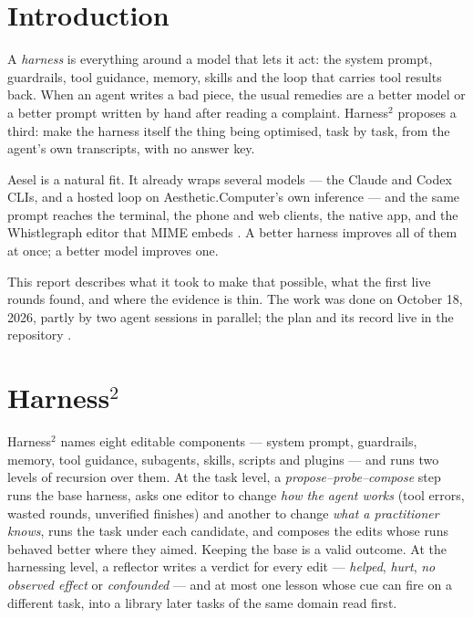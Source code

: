 \documentclass[10pt,letterpaper,twocolumn]{article}
\newcommand{\acdot}{{\color{acpink}.}}
\newcommand{\ac}{Aesthetic{\acdot}Computer}
\begin{document}
\section{Introduction}
\label{sec:intro}

A \emph{harness} is everything around a model that lets it act: the system
prompt, guardrails, tool guidance, memory, skills and the loop that carries
tool results back. When an agent writes a bad piece, the usual remedies are a
better model or a better prompt written by hand after reading a complaint.
Harness$^2$ proposes a third: make the harness itself the thing being
optimised, task by task, from the agent's own transcripts, with no answer key.

Aesel is a natural fit. It already wraps several models --- the Claude and
Codex CLIs, and a hosted loop on \ac{}'s own inference --- and the same
prompt reaches the terminal, the phone and web clients, the native app, and the
Whistlegraph editor that MIME embeds \citep{scudder2026easel,scudder2026strangers}.
A better harness improves all of them at once; a better model improves one.

This report describes what it took to make that possible, what the first live
rounds found, and where the evidence is thin. The work was done on October 18,
2026, partly by two agent sessions in parallel; the plan and its record live in
the repository \citep{aeselharnessdoc}.

\section{\texorpdfstring{Harness$^2$}{Harness2}}
\label{sec:method}

Harness$^2$ \citep{xu2026harness2,harness2repo} names eight editable components
--- system prompt, guardrails, memory, tool guidance, subagents, skills,
scripts and plugins --- and runs two levels of recursion over them. At the
task level, a \emph{propose--probe--compose} step runs the base harness,
asks one editor to change \emph{how the agent works} (tool errors, wasted
rounds, unverified finishes) and another to change \emph{what a practitioner
knows}, runs the task under each candidate, and composes the edits whose runs
behaved better where they aimed. Keeping the base is a valid outcome. At the
harnessing level, a reflector writes a verdict for every edit ---
\emph{helped}, \emph{hurt}, \emph{no observed effect} or \emph{confounded} ---
and at most one lesson whose cue can fire on a different task, into a library
later tasks of the same domain read first.
\end{document}
